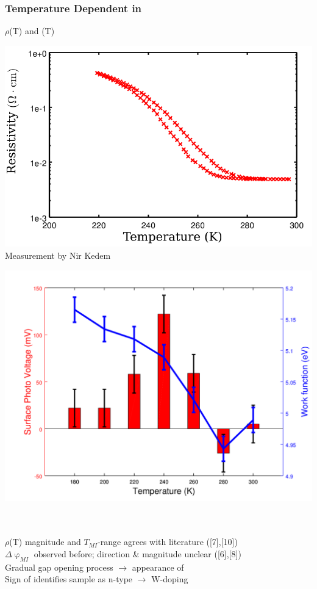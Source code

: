 \documentclass{beamer}
\begin{document}
\begin{frame}
\frametitle{Temperature Dependent \spv{} in \wvadiox{}}
\begin{block}{$\rho$(T) and \spv{}(T)}
\centering
\begin{minipage}{0.45\linewidth}
\centering
	\includegraphics[width=0.9\linewidth]{./figs/pres/vo2resis}\\
	{\tiny Measurement by Nir Kedem}
\end{minipage}
\hfill
\begin{minipage}{0.45\linewidth}
\centering
	\includegraphics[width=0.9\linewidth]{./figs/pres/vox3}\\
\end{minipage}\\[2pt]\hrulefill\\[2pt]
$\rho$(T) magnitude and $T_{MI}$-range agrees with literature (\textcolor{RUred}{[7]},\textcolor{RUred}{[10]})\\
$\Delta \upvarphi _{MI}$ observed before; direction \& magnitude unclear (\textcolor{RUred}{[6]},\textcolor{RUred}{[8]})\\
Gradual gap opening process $\rightarrow$ appearance of \spv{}\\
Sign of \spv{} identifies sample as n-type $\rightarrow$ W-doping
\end{block}\end{frame}
\end{document}
